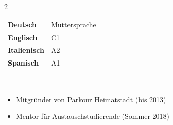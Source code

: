 \documentclass[pastel]{hipstercv}
\newlength{\leftcolwidth}
\begin{document}
\begin{paracol}{2}
{\begin{minipage}[t]{\leftcolwidth}
\hspace{-2.5em}\begin{tabular}{l | l}
    \textbf{Deutsch} & Muttersprache\\[1pt]
    \textbf{Englisch} & C1\\[1pt]
    \textbf{Italienisch} & A2\\[1pt] %
    \textbf{Spanisch} & A1
\end{tabular}

\vspace{5em}

\hspace{-0.7cm}
\\

\hspace{-1.2cm}\begin{minipage}[t]{1.2\leftcolwidth}
    \begin{itemize}
    \item Mitgründer von \href{https://www.parkour-Heimatstadt.de/}{Parkour Heimatstadt} (bis 2013)
    \item Mentor für Austauschstudierende (Sommer 2018)
    \end{itemize}
\end{minipage}%

\end{minipage}


\bigskip

\phantom{turn the page}
\phantom{turn the page}

\begin{minipage}[t]{\leftcolwidth}
\vspace{0.3em}

\vspace{3em}

\hspace{-0.7cm} \\

\hspace{-1em}\begin{minipage}[t]{\leftcolwidth}
     
    \hspace{0.1cm}%
    \hspace{0.1cm}
    \hspace{0.1cm} 
    \vspace{0.3em}
\end{minipage}


\end{minipage}}
\end{paracol}
\end{document}
